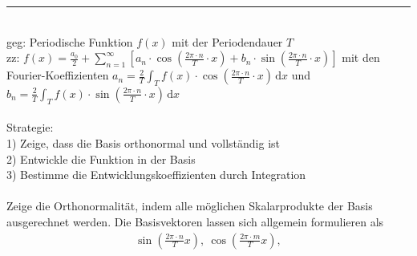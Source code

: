 \documentclass{article}
\newcommand{\diff}{\mathrm{d}}
\newcommand{\lr}[1]{\left(#1\right)}
\newcommand{\lreck}[1]{\left[#1\right]}
\begin{document}
\newpage


{\color{violet}
\hrule
	\\
	geg: Periodische Funktion $f(x)$ mit der Periodendauer $T$\\
	zz: $f(x) = \frac{a_0}{2} + \sum_{n=1}^\infty \lreck{ a_n \cdot \cos\lr{ \frac{2\pi \cdot n}{T} \cdot x } + b_n \cdot \sin\lr{ \frac{2\pi \cdot n}{T} \cdot x } }$ mit den Fourier-Koeffizienten $a_n = \frac{2}{T} \int_T f(x) \cdot \cos \lr{ \frac{2\pi \cdot n}{T} \cdot x } \, \diff x$ und $b_n = \frac{2}{T} \int_T f(x) \cdot \sin \lr{ \frac{2\pi \cdot n}{T} \cdot x } \, \diff x$\\
	\\
	Strategie:\\
	1) Zeige, dass die Basis orthonormal und vollständig ist\\
	2) Entwickle die Funktion in der Basis\\
	3) Bestimme die Entwicklungskoeffizienten durch Integration\\
	\\
	Zeige die Orthonormalität, indem alle möglichen Skalarprodukte der Basis ausgerechnet werden. Die Basisvektoren lassen sich allgemein formulieren als
		\begin{align*}
			\sin\lr{ \frac{2\pi \cdot n}{T} x }, \ \cos\lr{ \frac{2\pi \cdot m}{T} x },
		\end{align*}
	
}
\end{document}

